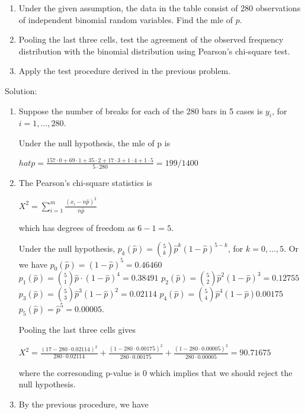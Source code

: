 \documentclass[letterpaper,10pt,english]{sphinxmanual}
\begin{document}
\begin{enumerate}
\item {} 
Under the given assumption, the data in the table consist of 280 observations of independent binomial random variables. Find the mle of \(p\).

\item {} 
Pooling the last three cells, test the agreement of the observed frequency distribution with the binomial distribution using Pearson’s chi-square test.

\item {} 
Apply the test procedure derived in the previous problem.

\end{enumerate}

Solution:
\begin{enumerate}
\item {} 
Suppose the number of breaks for each of the \(280\) bars in 5 cases is \(y_i\), for \(i = 1, \dots, 280\).

Under the null hypothesis, the mle of p is

\(hat{p}=\frac{157 \cdot 0 + 69 \cdot 1 + 35 \cdot 2 + 17 \cdot3 + 1 \cdot 4 + 1 \cdot 5}{5 \cdot 280} = 199/1400\)

\item {} 
The Pearson's chi-square statistics is

\(X^2 = \sum_{i=1}^m \frac{(x_i - n\hat{p})^2}{n\hat{p}}\)

which has degrees of freedom as \(6 - 1 = 5\).

Under the null hypothesis, \(p_k(\hat{p}) = {5 \choose k} \hat{p}^k (1 - \hat{p})^{5 - k}\), for \(k = 0, \dots, 5\). Or we have
\(p_0(\hat{p}) = (1 - \hat{p})^5 = 0.46460\)
\(p_1(\hat{p}) = {5 \choose 1} \hat{p} \cdot (1 - \hat{p})^4 = 0.38491\)
\(p_2(\hat{p}) = {5 \choose 2}\hat{p}^2 (1 - \hat{p})^3 = 0.12755\)
\(p_3(\hat{p}) = {5 \choose 3} \hat{p}^3 (1 - \hat{p})^2 =  0.02114\)
\(p_4(\hat{p}) = {5 \choose 4} \hat{p}^4 (1 - \hat{p})0.00175\)
\(p_5(\hat{p}) = \hat{p}^5 = 0.00005\).

Pooling the last three cells gives

\(X^2 = \frac{(17 - 280 \cdot 0.02114)^2}{280 \cdot 0.02114} + \frac{(1 - 280 \cdot 0.00175)^2}{280 \cdot 0.00175} + \frac{(1 - 280 \cdot 0.00005)^2}{280 \cdot 0.00005} = 90.71675\)

where the corresonding p-value is 0 which implies that we should reject the null hypothesis.

\item {} 
By the previous procedure, we have


\end{enumerate}
\end{document}
